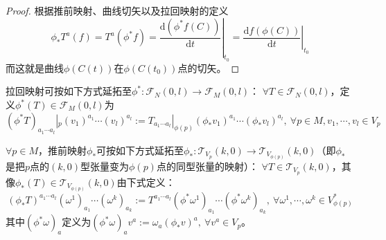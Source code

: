 \begin{proof}
	根据推前映射、曲线切矢以及拉回映射的定义
	$$\phi_*T^a(f)
		= T^a(\phi^*f)
		= \left.\frac{\mathrm{d}(\phi^*f(C))}{\mathrm{d}t}\right|_{t_0}
		= \left.\frac{\mathrm{d}f(\phi(C))}{\mathrm{d}t}\right|_{t_0}$$
	而这就是曲线$\phi(C(t))$在$\phi(C(t_0))$点的切矢。
\end{proof}

\begin{definition}
	拉回映射可按如下方式延拓至$\phi^* \colon \mathscr{F}_N(0, l) \to \mathscr{F}_M(0, l)$：
	$\forall T \in \mathscr{F}_N(0, l)$，定义$\phi^*(T) \in \mathscr{F}_M(0, l)$为
	$$(\phi^*T)_{a_1 \cdots a_l}|_p(v_1)^{a_1}\cdots(v_l)^{a_l} := T_{a_1 \cdots a_l}|_{\phi(p)}(\phi_*v_1)^{a_1}\cdots(\phi_*v_l)^{a_l}, ~ \forall p \in M, v_1, \cdots, v_l \in V_p$$
\end{definition}

\begin{definition}
	$\forall p \in M$，推前映射$\phi_*$可按如下方式延拓至$\phi_* \colon \mathscr{T}_{V_p}(k, 0) \to \mathscr{T}_{V_{\phi(p)}}(k, 0)$（即$\phi_*$是把$p$点的$(k, 0)$型张量变为$\phi(p)$点的同型张量的映射）：
	$\forall T \in \mathscr{T}_{V_p}(k, 0)$，其像$\phi_*(T) \in \mathscr{T}_{V_{\phi(p)}}(k, 0)$由下式定义：
	$$(\phi_*T)^{a_1 \cdots a_l}(\omega^1)_{a_1}\cdots(\omega^k)_{a_k} := T^{a_1 \cdots a_l}(\phi^*\omega^1)_{a_1}\cdots(\phi^*\omega^k)_{a_k}, ~ \forall \omega^1, \cdots, \omega^k \in V^*_{\phi(p)}$$
	其中$(\phi^*\omega)_a$定义为$(\phi^*\omega)_av^a := \omega_a(\phi_*v)^a, ~ \forall v^a \in V_p$。
\end{definition}

